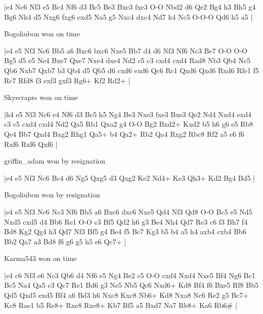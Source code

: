 \makegametitle
|e4 Nc6 Nf3 e5 Bc4 Nf6 d3 Bc5 Be3 Bxe3 fxe3 O-O Nbd2 d6 Qe2 Bg4 h3 Bh5 g4 Bg6 Nh4 d5 Nxg6 fxg6 exd5 Na5 g5 Nxc4 dxc4 Nd7 h4 Nc5 O-O-O Qd6 h5 a5  |

\showboard

Bogoliubon won on time

\makegametitle
|e4 e5 Nf3 Nc6 Bb5 a6 Bxc6 bxc6 Nxe5 Bb7 d4 d6 Nf3 Nf6 Nc3 Be7 O-O O-O Bg5 d5 e5 Ne4 Bxe7 Qxe7 Nxe4 dxe4 Nd2 c5 c3 cxd4 cxd4 Rad8 Nb3 Qb4 Nc5 Qb6 Nxb7 Qxb7 b3 Qb4 d5 Qb5 d6 cxd6 exd6 Qc6 Rc1 Qxd6 Qxd6 Rxd6 Rfe1 f5 Rc7 Rfd8 f3 exf3 gxf3 Rg6+ Kf2 Rd2+  |

\showboard

Skyscraprs won on time

\makegametitle
|h4 e5 Nf3 Nc6 e4 Nf6 d3 Bc5 h5 Ng4 Be3 Nxe3 fxe3 Bxe3 Qe2 Nd4 Nxd4 exd4 c3 c5 cxd4 cxd4 Nd2 Qa5 Rb1 Qxa2 g4 O-O Bg2 Bxd2+ Kxd2 b5 h6 g6 e5 Rb8 Qe4 Bb7 Qxd4 Bxg2 Rhg1 Qa5+ b4 Qa2+ Rb2 Qa4 Rxg2 Rbc8 Rf2 a5 e6 f6 Rxf6 Rxf6 Qxf6  |

\showboard

griffin\_adam won by resignation

\makegametitle
|e4 e5 Nf3 Nc6 Bc4 d6 Ng5 Qxg5 d3 Qxg2 Ke2 Nd4+ Ke3 Qh3+ Kd2 Bg4 Bd5  |

\showboard

Bogoliubon won by resignation

\makegametitle
|e4 e5 Nf3 Nc6 Nc3 Nf6 Bb5 a6 Bxc6 dxc6 Nxe5 Qd4 Nf3 Qd8 O-O Bc5 e5 Nd5 Nxd5 cxd5 d4 Bb6 Re1 O-O c3 Bf5 Qd2 h6 g3 Be4 Nh4 Qd7 Re3 c6 f3 Bh7 f4 Bd8 Kg2 Qg4 h3 Qd7 Nf3 Bf5 g4 Be4 f5 Bc7 Kg3 b5 b4 a5 h4 axb4 cxb4 Bb6 Bb2 Qa7 a3 Bd8 f6 g6 g5 h5 e6 Qc7+  |

\showboard

Karma543 won on time

\makegametitle
|e4 c6 Nf3 e6 Nc3 Qb6 d4 Nf6 e5 Ng4 Be2 c5 O-O cxd4 Nxd4 Nxe5 Bf4 Ng6 Bc1 Bc5 Na4 Qa5 c3 Qc7 Re1 Bd6 g3 Ne5 Nb5 Qc6 Nxd6+ Kd8 Bf4 f6 Bxe5 Rf8 Bb5 Qd5 Qxd5 exd5 Bf4 a6 Bd3 h6 Nxc8 Kxc8 Nb6+ Kd8 Nxa8 Nc6 Re2 g5 Bc7+ Kc8 Rae1 b5 Re8+ Rxe8 Rxe8+ Kb7 Bf5 a5 Bxd7 Na7 Rb8+ Ka6 Rb6\#  |

